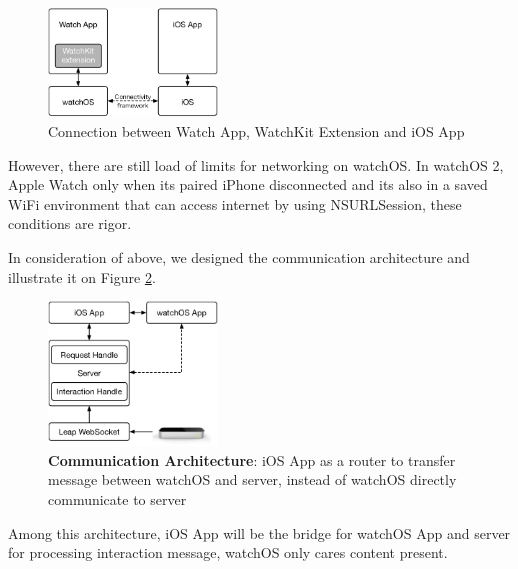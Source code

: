 \begin{figure}[H]
    \kaishu
    \centering
    \includegraphics[width=0.4\textwidth]{figures/watch-phone}
    \caption{\kaishu Connection between Watch App, WatchKit Extension and iOS App}
    \label{fig:watch-phone}
\end{figure}

However, there are still load of limits for networking on watchOS. In watchOS 2, Apple Watch only when its paired iPhone disconnected and its also in a saved WiFi environment that can access internet by using NSURLSession, these conditions are rigor.

In consideration of above, we designed the communication architecture and illustrate it on Figure \ref{fig:im-arch}.

\begin{figure}[H]
    \kaishu
    \centering
    \includegraphics[width=0.4\textwidth]{figures/arch}
    \caption{\kaishu \textbf{Communication Architecture}: iOS App as a router to transfer message between watchOS and server, instead of watchOS directly communicate to server}
    \label{fig:im-arch}
\end{figure}

Among this architecture, iOS App will be the bridge for watchOS App and server for processing interaction message, watchOS only cares content present.

